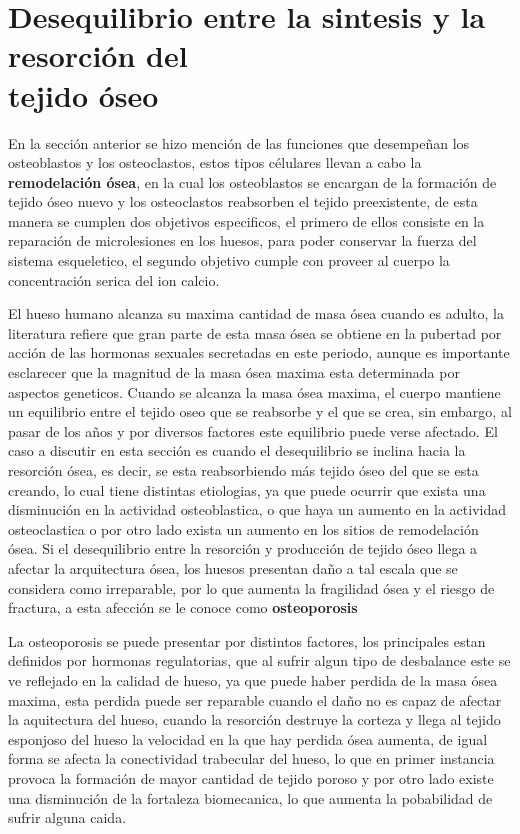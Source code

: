 \documentclass[letterpaper,12pt,oneside]{book}
\begin{document}
 



    
    \section{Desequilibrio entre la sintesis y la resorción del \\ tejido óseo}

    En la sección anterior se hizo mención de las funciones que desempeñan los osteoblastos y los osteoclastos, estos tipos célulares llevan a cabo la \textbf{remodelación ósea}, en la cual los osteoblastos se encargan de la formación de tejido óseo nuevo y los osteoclastos reabsorben el tejido preexistente, de esta manera se cumplen dos objetivos especificos, el primero de ellos consiste en la reparación de microlesiones en los huesos, para poder conservar la fuerza del sistema esqueletico, el segundo objetivo cumple con proveer al cuerpo la  concentración serica del ion calcio. 

    \vspace{10pt}

    El hueso humano alcanza su maxima cantidad de masa ósea cuando es adulto, la literatura refiere que gran parte de esta masa ósea se obtiene en la pubertad por acción de las hormonas sexuales secretadas en este periodo, aunque es importante esclarecer que la magnitud de la masa ósea maxima esta determinada por aspectos geneticos. Cuando se alcanza la masa ósea maxima, el cuerpo mantiene un equilibrio entre el tejido oseo que se reabsorbe y el que se crea, sin embargo, al pasar de los años y por diversos factores este equilibrio puede verse afectado. El caso a discutir en esta sección es cuando el desequilibrio se inclina hacia la resorción ósea, es decir, se esta reabsorbiendo más tejido óseo del que se esta creando, lo cual tiene distintas etiologias, ya que puede ocurrir que exista una disminución en la actividad osteoblastica, o que haya un aumento en la actividad osteoclastica o por otro lado exista un aumento en los sitios de remodelación ósea. Si el desequilibrio entre la resorción y producción de tejido óseo llega a afectar la arquitectura ósea, los huesos presentan daño a tal escala que se considera como irreparable, por lo que aumenta la fragilidad ósea y el riesgo de fractura, a esta afección se le conoce como \textbf{osteoporosis}

    \vspace{10pt}

    La osteoporosis se puede presentar por distintos factores, los principales estan definidos por hormonas regulatorias, que al sufrir algun tipo de desbalance este se ve reflejado en la calidad de hueso, ya que puede haber perdida de la masa ósea maxima, esta perdida puede ser reparable cuando el daño no es capaz de afectar la aquitectura del hueso, cuando la resorción destruye la corteza y llega al tejido esponjoso del hueso la velocidad en la que hay perdida ósea aumenta, de igual forma se afecta la conectividad trabecular del hueso, lo que en primer instancia provoca la formación de mayor cantidad de tejido poroso y por otro lado existe una disminución de la fortaleza biomecanica, lo que aumenta la pobabilidad de sufrir alguna caida. 
\end{document}
